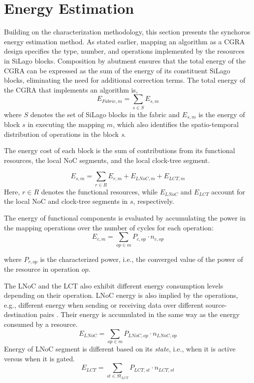 \section{Energy Estimation}
Building on the characterization methodology, this section presents the synchoros energy estimation method.
As stated earlier, mapping an algorithm as a CGRA design specifies the type, number, and operations implemented by the resources in SiLago blocks. 
Composition by abutment ensures that the total energy of the CGRA can be expressed as the sum of the energy of its constituent SiLago blocks, eliminating the need for additional correction terms.
The total energy of the CGRA that implements an algorithm is,
\begin{equation}
E_{Fabric,m}=\sum_{s \in S} E_{s,m}
\end{equation}
where $S$ denotes the set of SiLago blocks in the fabric and $E_{s,m}$ is the energy of block $s$ in executing the mapping $m$, which also identifies the spatio-temporal distribution of operations in the block \textit{s}. 

The energy cost of each block is the sum of contributions from its functional resources, the local NoC segments, and the local clock-tree segment.

\begin{equation}
E_{s,m}=\sum_{r \in R}E_{r,m} + E_{LNoC,m} + E_{LCT,m} 
\end{equation}
Here, ${r \in R}$ denotes the functional resources, while $E_{LNoC}$ and $E_{LCT}$ account for the local NoC and clock-tree segments in $s$, respectively.

The energy of functional components is evaluated by accumulating the power in the mapping operations over the number of cycles for each operation:
\begin{equation}
E_{c,m} = \sum_{op \in m} P_{c,op} \cdot n_{c,op}
\end{equation}

where $P_{r,op}$ is the characterized power, i.e., the converged value of the power of the resource in operation $op$.

The LNoC and the LCT also exhibit different energy consumption levels depending on their operation. 
LNoC energy is also implied by the operations, e.g., different energy when sending or receiving data over different source-destination pairs .
Their energy is accumulated in the same way as the energy consumed by a resource.
\begin{equation}
E_{LNoC} =
\sum_{op \in m}
P_{LNoC,op} \cdot n_{LNoC,op}
\end{equation}
Energy of LNoC segment is different based on its \textit{state}, i.e., when it is active versus when it is gated. 
\begin{equation}
E_{LCT} =
\sum_{st \in St_{LCT}}
P_{LCT,st} \cdot n_{LCT,st}
\end{equation}


